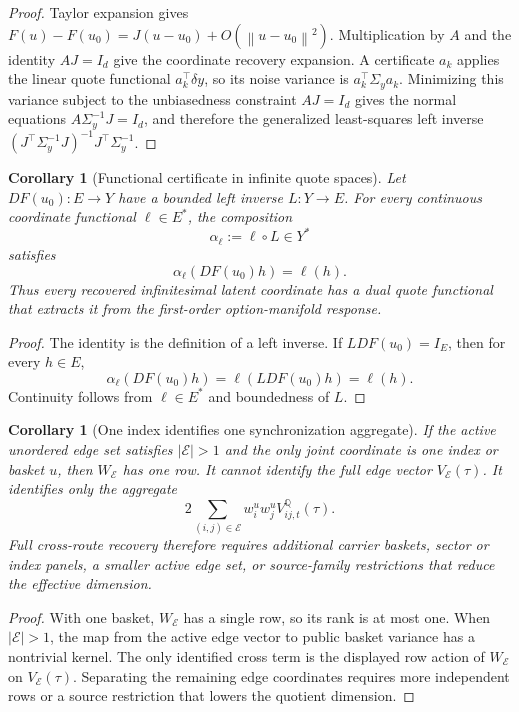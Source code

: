 \documentclass[11pt,a4paper]{amsart}
\theoremstyle{plain}
\newtheorem{corollary}[theorem]{Corollary}
\theoremstyle{definition}
\theoremstyle{remark}
\newcommand{\QQ}{\mathbb{Q}}
\newcommand{\cE}{\mathcal{E}}
\newcommand{\norm}[1]{\left\lVert #1\right\rVert}
\begin{document}
\begin{proof}
Taylor expansion gives
\(F(u)-F(u_0)=J(u-u_0)+O(\norm{u-u_0}^2)\).  Multiplication by \(A\) and the identity
\(AJ=I_d\) give the coordinate recovery expansion.  A certificate \(a_k\) applies the linear quote
functional \(a_k^\top\delta y\), so its noise variance is \(a_k^\top\Sigma_y a_k\).  Minimizing
this variance subject to the unbiasedness constraint \(AJ=I_d\) gives the normal equations
\(A\Sigma_y^{-1}J=I_d\), and therefore the generalized least-squares left inverse
\((J^\top\Sigma_y^{-1}J)^{-1}J^\top\Sigma_y^{-1}\).
\end{proof}

\begin{corollary}[Functional certificate in infinite quote spaces]\label{cor:functional-certificate}
Let \(DF(u_0):E\to Y\) have a bounded left inverse \(L:Y\to E\).  For every continuous coordinate
functional \(\ell\in E^\ast\), the composition
\[
        \alpha_\ell:=\ell\circ L\in Y^\ast
\]
satisfies
\[
        \alpha_\ell(DF(u_0)h)=\ell(h).
\]
Thus every recovered infinitesimal latent coordinate has a dual quote functional that extracts it
from the first-order option-manifold response.
\end{corollary}

\begin{proof}
The identity is the definition of a left inverse.  If \(LDF(u_0)=I_E\), then for every
\(h\in E\),
\[
        \alpha_\ell(DF(u_0)h)
        =
        \ell(LDF(u_0)h)
        =
        \ell(h).
\]
Continuity follows from \(\ell\in E^\ast\) and boundedness of \(L\).
\end{proof}


\begin{corollary}[One index identifies one synchronization aggregate]\label{cor:one-index-aggregate}
If the active unordered edge set satisfies \(|\cE|>1\) and the only joint coordinate is one
index or basket \(u\), then \(W_{\cE}\) has one row.  It cannot identify the full edge vector
\(V_{\cE}(\tau)\).  It identifies only the aggregate
\[
        2\sum_{(i,j)\in\cE}w_i^u w_j^uV_{ij,t}^\QQ(\tau).
\]
Full cross-route recovery therefore requires additional carrier baskets, sector or index
panels, a smaller active edge set, or source-family restrictions that reduce the effective
dimension.
\end{corollary}

\begin{proof}
With one basket, \(W_{\cE}\) has a single row, so its rank is at most one.  When
\(|\cE|>1\), the map from the active edge vector to public basket variance has a nontrivial kernel.
The only identified cross term is the displayed row action of \(W_{\cE}\) on
\(V_{\cE}(\tau)\).  Separating the remaining edge coordinates requires more independent rows or a
source restriction that lowers the quotient dimension.
\end{proof}
\end{document}
